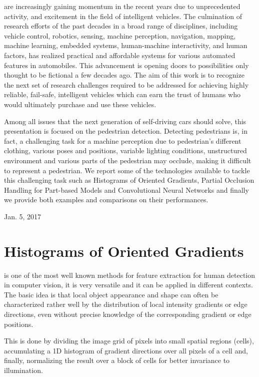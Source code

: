 \documentclass[10pt,journal,compsoc]{IEEEtran}
\begin{document}
 are increasingly gaining momentum in the
recent years due to unprecedented activity, and excitement in the field
of intelligent vehicles. The culmination of
research efforts of the past decades in a broad range of disciplines, including
vehicle control, robotics, sensing, machine perception, navigation, mapping,
machine learning, embedded systems, human-machine interactivity, and human factors,
has realized practical and affordable systems for various automated features in
automobiles. This advancement is opening doors to possibilities only thought to
be fictional a few decades ago. The aim of this work is to recognize the next set
of research challenges required to be addressed for achieving highly reliable,
fail-safe, intelligent vehicles which can earn the trust of humans who would
ultimately purchase and use these vehicles.

Among all issues that the next generation of self-driving cars should solve, this
presentation is focused on the pedestrian detection. Detecting pedestrians is, in fact,
a challenging task for a machine perception due to pedestrian’s different
clothing, various poses and positions, variable lighting conditions, unstructured
environment and various parts of the pedestrian may occlude, making it difficult
to represent a pedestrian. We report some of the technologies available to tackle
this challenging task such as Histograms of Oriented Gradients, Partial Occlusion
Handling for Part-based Models and Convolutional Neural Networks and finally we
provide both examples and comparisons on their performances.

\hfill Jan. 5, 2017



\section{Histograms of Oriented Gradients}
\label{sec:HOG}
 is one of the most well known methods for feature
extraction for human detection in computer vision, it is very versatile and it
can be applied in different contexts. The basic idea is that local object appearance
and shape can often be characterized rather well by the distribution of local
intensity gradients or edge directions, even without precise knowledge of the
corresponding gradient or edge positions.

This is done by dividing the image grid of pixels into small spatial regions (cells),
accumulating a 1D histogram of gradient directions over all pixels of a cell and,
finally, normalizing the result over a block of cells for better invariance to illumination.
\end{document}
